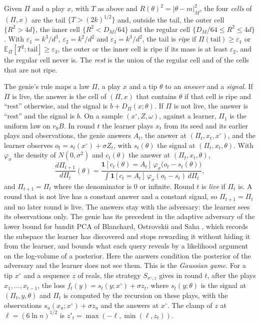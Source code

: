\documentclass[11pt]{amsart}
\theoremstyle{definition}
\numberwithin{equation}{section}
\newcommand{\E}{\mathbb{E}}
\begin{document}
Given $\Pi$ and a play $x$, with $T$ as above and $R(\theta)^2=|\theta-m|_M^2$, the four \emph{cells} of $(\Pi,x)$ are the tail $\{T>(2k)^{1/2}\}$ and, outside the tail, the outer cell $\{R^2>4d\}$, the inner cell $\{R^2<D_M/64\}$ and the regular cell $\{D_M/64\le R^2\le4d\}$. With $\varepsilon_1=k^3/d^3$, $\varepsilon_2=k^2/d^2$ and $\varepsilon_3=k^3/d^2$, the tail is \emph{ripe} if $\Pi(\mathrm{tail})\ge\varepsilon_1$ or $\E_\Pi[T^2;\mathrm{tail}]\ge\varepsilon_3$, the outer or the inner cell is ripe if its mass is at least $\varepsilon_2$, and the regular cell never is. The \emph{rest} is the union of the regular cell and of the cells that are not ripe.

The genie's rule maps a law $\Pi$, a play $x$ and a tip $\theta$ to an \emph{answer} and a \emph{signal}. If $\Pi$ is live, the answer is the cell of $(\Pi,x)$ that contains $\theta$ if that cell is ripe and ``rest'' otherwise, and the signal is $b+D_\Pi(x;\theta)$. If $\Pi$ is not live, the answer is ``rest'' and the signal is $b$. On a sample $(x^\circ,Z,\omega)$, against a learner, $\Pi_1$ is the uniform law on $r_0B$. In round $t$ the learner plays $x_t$ from its seed and its earlier plays and observations, the genie answers $A_t$, the answer at $(\Pi_t,x_t,x^\circ)$, and the learner observes $o_t=s_t(x^\circ)+\sigma Z_t$, with $s_t(\theta)$ the signal at $(\Pi_t,x_t,\theta)$. With $\varphi_\sigma$ the density of $N(0,\sigma^2)$ and $c_t(\theta)$ the answer at $(\Pi_t,x_t,\theta)$,
\[
\frac{d\Pi_{t+1}}{d\Pi_t}(\theta)=\frac{\mathbf 1[c_t(\theta)=A_t]\,\varphi_\sigma\bigl(o_t-s_t(\theta)\bigr)}{\int\mathbf 1[c_t=A_t]\,\varphi_\sigma(o_t-s_t)\,d\Pi_t},
\]
and $\Pi_{t+1}=\Pi_t$ where the denominator is $0$ or infinite. Round $t$ is \emph{live} if $\Pi_t$ is. A round that is not live has a constant answer and a constant signal, so $\Pi_{t+1}=\Pi_t$ and no later round is live. The answers stay with the adversary: the learner sees its observations only. The genie has its precedent in the adaptive adversary of the lower bound for bandit PCA of Blanchard, Ostrovskii and Saha \cite[Section~4]{BOS26}, which records the subspace the learner has discovered and stops rewarding it without hiding it from the learner, and bounds what each query reveals by a likelihood argument on the log-volume of a posterior. Here the answers condition the posterior of the adversary and the learner does not see them. This is the \emph{Gaussian game}. For a tip $x^\circ$ and a sequence $z$ of reals, the strategy $S_{x^\circ,z}$ gives in round $t$, after the plays $x_1,\dots,x_{t-1}$, the loss $f_t(y)=s_t(y;x^\circ)+\sigma z_t$, where $s_t(y;\theta)$ is the signal at $(\Pi_t,y,\theta)$ and $\Pi_t$ is computed by the recursion on these plays, with the observations $s_u(x_u;x^\circ)+\sigma z_u$ and the answers at $x^\circ$. The clamp of $z$ at $\ell=(6\ln n)^{1/2}$ is $z'_t=\max(-\ell,\min(\ell,z_t))$.
\end{document}
